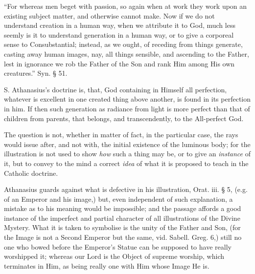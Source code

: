 ``For whereas men beget with passion, so again
when at work they work upon an existing subject matter, and otherwise
cannot make. Now if we do not understand creation in a human way, when
we attribute it to God, much less seemly is it to understand
generation in a human way, or to give a corporeal sense to
Consubstantial; instead, as we ought, of receding from things
generate, casting away human images, nay, all things sensible, and
ascending to the Father, lest in ignorance we rob the Father of the
Son and rank Him among His own creatures.'' Syn. § 51.

S. Athanasius's doctrine is, that, God
containing in Himself all perfection, whatever is excellent in one
created thing above another, is found in its perfection in him. If
then such generation as radiance from light is more perfect than that
of children from parents, that belongs, and transcendently, to the
All-perfect God.

The question is not, whether in matter of fact,
in the particular case, the rays would issue after, and not with, the
initial existence of the luminous body; for the illustration is not
used to show \emph{how} such a thing may be, or to give an \emph{instance}
of it, but to convey to the mind a correct \emph{idea} of what
it is proposed to teach in the Catholic doctrine.

Athanasius guards against what is defective in
his illustration, Orat. iii. § 5, (e.g. of an Emperor and his image,)
but, even independent of such explanation, a mistake as to his meaning
would be impossible; and the passage affords a good instance of the
imperfect and partial character of all illustrations of the Divine
Mystery. What it is taken to symbolise is the unity of the Father and
Son, (for the Image is not a Second Emperor but the same, vid. Sabell.
Greg. 6,) still no one who bowed before the Emperor's Statue can be
supposed to have really worshipped it; whereas our Lord is the Object
of supreme worship, which terminates in Him, as being really one with
Him whose Image He is.

